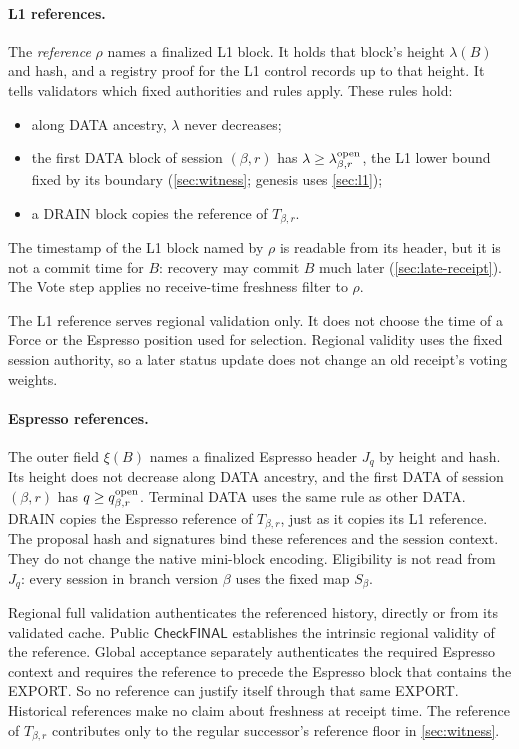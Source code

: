 \documentclass[11pt,a4paper]{article}
\newcommand{\tagg}[1]{\ensuremath{\mathsf{#1}}}
\newcommand{\defterm}[1]{\textcolor{rrBlue}{\textit{#1}}}
\begin{document}
\paragraph{L1 references.}
The \defterm{reference} $\rho$ names a finalized L1 block. It holds that
block's height $\lambda(B)$ and hash, and a registry proof for the L1
control records up to that height. It tells validators which fixed
authorities and rules apply. These rules hold:
\begin{itemize}
\item along DATA ancestry, $\lambda$ never decreases;
\item the first DATA block of session $(\beta,r)$ has $\lambda\ge
\lambda^{\rm open}_{\beta,r}$, the L1 lower bound fixed by its boundary
(\cref{sec:witness}; genesis uses \cref{sec:l1});
\item a DRAIN block copies the reference of $T_{\beta,r}$.
\end{itemize}
The timestamp of the L1 block named by $\rho$ is readable from its
header, but it is not a commit time for $B$: recovery may commit $B$
much later (\cref{sec:late-receipt}). The Vote step applies no
receive-time freshness filter to $\rho$.

The L1 reference serves regional validation only. It does not choose
the time of a Force or the Espresso position used for selection.
Regional validity uses the fixed session authority, so a later status
update does not change an old receipt's voting weights.

\paragraph{Espresso references.}
The outer field $\xi(B)$ names a finalized Espresso header $J_q$ by
height and hash. Its height does not decrease along DATA ancestry, and
the first DATA of session $(\beta,r)$ has
$q\ge q_{\beta,r}^{\rm open}$. Terminal DATA uses the same rule as other
DATA. DRAIN copies the Espresso reference of $T_{\beta,r}$, just as it
copies its L1 reference. The proposal hash and signatures bind these
references and the session context. They do not change the native
mini-block encoding. Eligibility is not read from $J_q$: every session
in branch version $\beta$ uses the fixed map $S_\beta$.

Regional full validation authenticates the referenced history, directly
or from its validated cache. Public \tagg{CheckFINAL} establishes the
intrinsic regional validity of the reference. Global acceptance
separately authenticates the required Espresso context and requires the
reference to precede the Espresso block that contains the EXPORT. So no
reference can justify itself through that same EXPORT. Historical
references make no claim about freshness at receipt time. The reference
of $T_{\beta,r}$ contributes only to the regular successor's reference
floor in \cref{sec:witness}.
\end{document}
